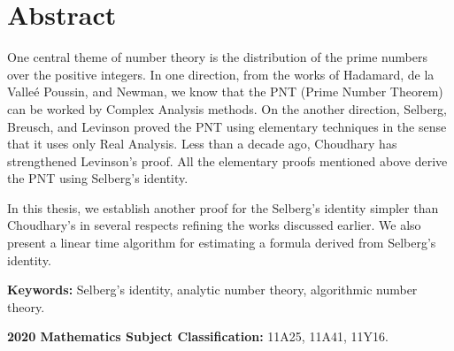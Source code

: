 \chapter*{Abstract}
One central theme of number theory is the distribution
of the prime numbers over the positive integers.
In one direction,
from the works of
Hadamard, de la Valle\'e Poussin, and Newman,
we know that the PNT (Prime Number Theorem)
can be worked by Complex Analysis methods.
On the another direction,
Selberg, Breusch, and Levinson proved the PNT
using elementary techniques in the sense that
it uses only Real Analysis.
Less than a decade ago,
Choudhary has strengthened Levinson's proof.
All the elementary proofs mentioned above
derive the PNT using Selberg's identity.

In this thesis,
we establish another proof for the Selberg's identity
simpler than Choudhary's in several respects
refining the works discussed earlier.
We also present a linear time algorithm for
estimating a formula derived from Selberg's identity.

\bigskip
\textbf{Keywords:}
Selberg's identity,
analytic number theory,
algorithmic number theory.

\bigskip
\textbf{2020 Mathematics Subject Classification:}
11A25,
11A41,
11Y16.
